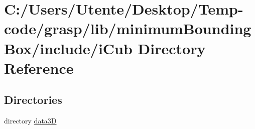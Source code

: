 \section{C\+:/\+Users/\+Utente/\+Desktop/\+Temp-\/code/grasp/lib/minimum\+Bounding\+Box/include/i\+Cub Directory Reference}
\label{dir_de71adeb27bc20bbe9a183506ef177a4}
\subsection*{Directories}
\begin{DoxyCompactItemize}
\item 
directory \hyperlink{dir_d1b40d230a761313a9d7cdc6cd113530}{data3\+D}
\end{DoxyCompactItemize}

